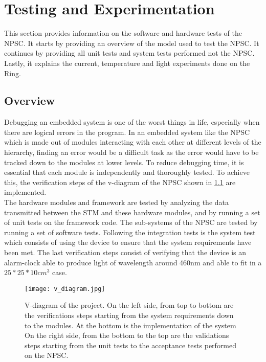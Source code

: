 \chapter{Testing and Experimentation} 
This section provides information on the software and hardware tests of the NPSC. It starts by providing an overview of the model used to test the NPSC. It continues by providing all unit tests and system tests performed not the NPSC. Lastly, it explains the current, temperature and light experiments done on the Ring.


\section{Overview}
Debugging an embedded system is one of the worst things in life, especially when there are logical errors in the program. In an embedded system like the NPSC which is made out of modules interacting with each other at different levels of the hierarchy, finding an error would be a difficult task as the error would have to be tracked down to the modules at lower levels. To reduce debugging time, it is essential that each module is independently and thoroughly tested. To achieve this, the verification steps of the v-diagram of the NPSC shown in \cref{fig:v_diagram} are implemented.\\
The hardware modules and framework are tested by analyzing the data transmitted between the STM and these hardware modules, and by running a set of unit tests on the framework code. The sub-systems of the NPSC are tested by running a set of software tests. Following the integration tests is the system test which consists of using the device to ensure that the system requirements have been met. The last verification steps consist of verifying that the device is an alarm-clock able to produce light of wavelength around 460nm and able to fit in a $25*25*10 cm^3$ case. 
\begin{landscape} 
	\begin{figure}[ht]
		\centering
		\texttt{[image: v\_diagram.jpg]}
		\caption{V-diagram of the project. On the left side, from top to bottom are the verifications steps starting from the system requirements down to the modules. At the bottom is the implementation of the system On the right side, from the bottom to the top are the validations steps starting from the unit tests to the acceptance tests performed on the NPSC.}
		\label{fig:v_diagram}
	\end{figure}
\end{landscape}
